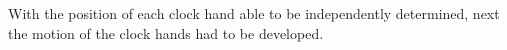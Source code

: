\documentclass[11pt]{article}
\begin{document}

With the position of each clock hand able to be independently determined, next the motion of the clock hands had to be developed. 
\end{document}
